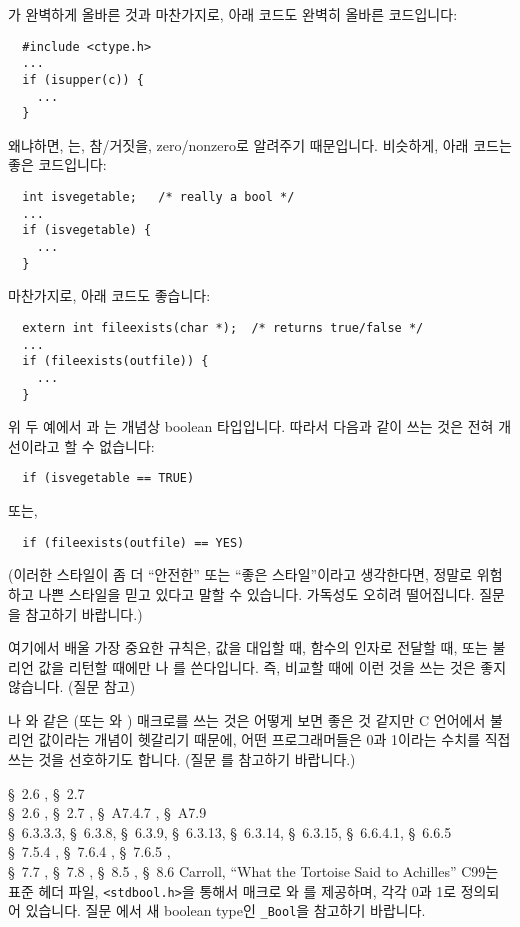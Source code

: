 \begin{faq}
        가 완벽하게 올바른 것과 마찬가지로, 아래 코드도
        완벽히 올바른 코드입니다:
\begin{verbatim}
  #include <ctype.h>
  ...
  if (isupper(c)) {
    ...
  }
\end{verbatim}
 	\noindent 왜냐하면, 는, 참/거짓을, zero/nonzero로 알려주기 
        때문입니다. 비슷하게, 아래 코드는 좋은 코드입니다:
\begin{verbatim}
  int isvegetable;   /* really a bool */
  ...
  if (isvegetable) {
    ...
  }
\end{verbatim}
	\noindent 마찬가지로, 아래 코드도 좋습니다:
\begin{verbatim}
  extern int fileexists(char *);  /* returns true/false */
  ...
  if (fileexists(outfile)) {
    ...
  }
\end{verbatim}
	\noindent 위 두 예에서 과 는 
        개념상 boolean 타입입니다. 따라서 다음과 같이 쓰는 것은 전혀
        개선이라고 할 수 없습니다:
\begin{verbatim}
  if (isvegetable == TRUE)
\end{verbatim}
	\noindent 또는,
\begin{verbatim}
  if (fileexists(outfile) == YES)
\end{verbatim}
	\noindent (이러한 스타일이 좀 더 ``안전한'' 또는 ``좋은 스타일''이라고
        생각한다면, 정말로 위험하고 나쁜 스타일을 믿고 있다고 말할 수 있습니다.
        가독성도 오히려 떨어집니다. 질문 을 참고하기 바랍니다.)

        여기에서 배울 가장 중요한 규칙은,
        값을 대입할 때, 함수의 인자로 전달할 때, 또는 불리언 값을
	리턴할 때에만 나 를 쓴다입니다.
	즉, 비교할 때에 이런 것을 쓰는 것은 좋지 않습니다. (질문  참고)

	나 와 같은 (또는 와 ) 매크로를
	쓰는 것은 어떻게 보면 좋은 것 같지만 C 언어에서 불리언 값이라는
	개념이 헷갈리기 때문에, 어떤 프로그래머들은
	0과 1이라는 수치를 직접 쓰는 것을 선호하기도 합니다.  (질문 를
	참고하기 바랍니다.)

\R
	\cite{kr1} \S\ 2.6 , \S\ 2.7  \\
	\cite{kr2} \S\ 2.6 , \S\ 2.7 , 
		\S\ A7.4.7 , \S\ A7.9  \\
	\cite{c89} \S\ 6.3.3.3, \S\ 6.3.8, \S\ 6.3.9, \S\ 6.3.13, 
		\S\ 6.3.14, \S\ 6.3.15, \S\ 6.6.4.1, \S\ 6.6.5 \\
	\cite{hs} \S\ 7.5.4 , \S\ 7.6.4 , 
		\S\ 7.6.5 , \\
        \cite{hs} \S\ 7.7 ,
		\S\ 7.8 , \S\ 8.5 , 
		\S\ 8.6  
	Carroll, ``What the Tortoise Said to Achilles''
\T
	C99는 표준 헤더 파일, \verb+<stdbool.h>+을 통해서 매크로
        와 를 제공하며, 각각 0과 1로 정의되어 있습니다.
	질문 에서 새 boolean type인 \verb+_Bool+을 참고하기 바랍니다.
\end{faq}

